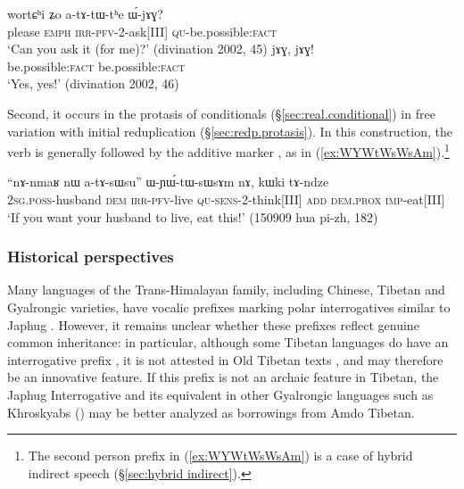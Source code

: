 \begin{exe}
\ex 
\begin{xlist}
\ex \label{ex:atAtWthe.WjAG}
 \gll wortɕʰi ʑo a-tɤ-tɯ-tʰe ɯ́-jɤɣ? \\
please \textsc{emph} \textsc{irr}-\textsc{pfv}-2-ask[III] \textsc{qu}-be.possible:\textsc{fact} \\ 
\glt `Can you ask it (for me)?' (divination 2002, 45)
\ex \label{ex:jAG.jAG}
 \gll jɤɣ, jɤɣ! \\
be.possible:\textsc{fact} be.possible:\textsc{fact} \\ 
\glt `Yes, yes!' (divination 2002, 46)
\end{xlist}
\end{exe}

Second, it occurs in the protasis of conditionals (§\ref{sec:real.conditional}) in free variation with initial reduplication (§\ref{sec:redp.protasis}). In this construction, the verb is generally followed by the additive marker , as in (\ref{ex:WYWtWsWsAm}).\footnote{The second person prefix  in (\ref{ex:WYWtWsWsAm}) is a case of hybrid indirect speech (§\ref{sec:hybrid indirect}). }
 
\begin{exe}
\ex \label{ex:WYWtWsWsAm}
 \gll ``nɤ-nmaʁ nɯ a-tɤ-sɯsu'' ɯ-ɲɯ́-tɯ-sɯsɤm nɤ, kɯki tɤ-ndze \\
 \textsc{2sg}.\textsc{poss}-husband \textsc{dem} \textsc{irr}-\textsc{pfv}-live \textsc{qu}-\textsc{sens}-2-think[III] \textsc{add} \textsc{dem}.\textsc{prox} \textsc{imp}-eat[III] \\
\glt `If you want your husband to live, eat this!' (150909 hua pi-zh, 182)
\end{exe}

\subsubsection{Historical perspectives} \label{sec:interrogative.e.history}

Many languages of the Trans-Himalayan family, including Chinese, Tibetan and Gyalrongic varieties, have vocalic prefixes marking polar interrogatives similar to Japhug  \citep{sunhk96yiwen}. However, it remains unclear whether these prefixes reflect genuine common inheritance: in particular, although some Tibetan languages do have an interrogative prefix , it is not attested in Old Tibetan texts \citep{hoshi12e}, and may therefore be an innovative feature. If this prefix is not an archaic feature in Tibetan,  the Japhug Interrogative  and its equivalent in other Gyalrongic languages such as Khroskyabs  (\citealt[340]{lai17khroskyabs}) may be better analyzed as borrowings from Amdo Tibetan.


